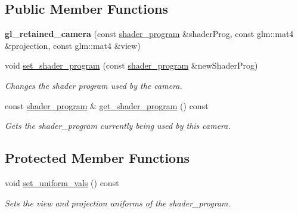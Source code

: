 \subsection*{Public Member Functions}
\begin{DoxyCompactItemize}
\item 
\hypertarget{classoccluded_1_1opengl_1_1retained_1_1scene_1_1objects_1_1gl__retained__camera_ac1db6211eadc863ce4a8a58b0e56eb19}{{\bfseries gl\+\_\+retained\+\_\+camera} (const \hyperlink{classoccluded_1_1opengl_1_1retained_1_1shaders_1_1shader__program}{shader\+\_\+program} \&shader\+Prog, const glm\+::mat4 \&projection, const glm\+::mat4 \&view)}\label{classoccluded_1_1opengl_1_1retained_1_1scene_1_1objects_1_1gl__retained__camera_ac1db6211eadc863ce4a8a58b0e56eb19}

\item 
void \hyperlink{classoccluded_1_1opengl_1_1retained_1_1scene_1_1objects_1_1gl__retained__camera_a9d8b99eb5ce9b41dd937628be26bfbf8}{set\+\_\+shader\+\_\+program} (const \hyperlink{classoccluded_1_1opengl_1_1retained_1_1shaders_1_1shader__program}{shader\+\_\+program} \&new\+Shader\+Prog)
\begin{DoxyCompactList}\small\item\em Changes the shader program used by the camera. \end{DoxyCompactList}\item 
const \hyperlink{classoccluded_1_1opengl_1_1retained_1_1shaders_1_1shader__program}{shader\+\_\+program} \& \hyperlink{classoccluded_1_1opengl_1_1retained_1_1scene_1_1objects_1_1gl__retained__camera_ae46ec6ddfd6d1144f3881ca8ca905fc8}{get\+\_\+shader\+\_\+program} () const 
\begin{DoxyCompactList}\small\item\em Gets the shader\+\_\+program currently being used by this camera. \end{DoxyCompactList}\end{DoxyCompactItemize}
\subsection*{Protected Member Functions}
\begin{DoxyCompactItemize}
\item 
\hypertarget{classoccluded_1_1opengl_1_1retained_1_1scene_1_1objects_1_1gl__retained__camera_a22200a4a40ef97c4213b576283d29e9d}{void \hyperlink{classoccluded_1_1opengl_1_1retained_1_1scene_1_1objects_1_1gl__retained__camera_a22200a4a40ef97c4213b576283d29e9d}{set\+\_\+uniform\+\_\+vals} () const }\label{classoccluded_1_1opengl_1_1retained_1_1scene_1_1objects_1_1gl__retained__camera_a22200a4a40ef97c4213b576283d29e9d}

\begin{DoxyCompactList}\small\item\em Sets the view and projection uniforms of the shader\+\_\+program. \end{DoxyCompactList}\end{DoxyCompactItemize}
